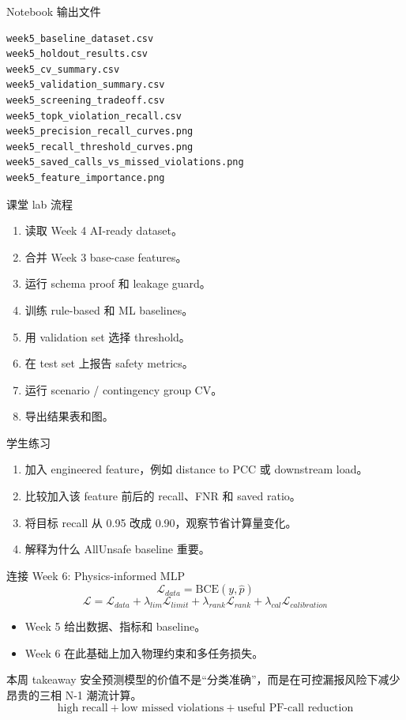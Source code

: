 \documentclass[aspectratio=169,11pt]{beamer}
\begin{document}
\begin{frame}[fragile]{Notebook 输出文件}
\begin{lstlisting}
week5_baseline_dataset.csv
week5_holdout_results.csv
week5_cv_summary.csv
week5_validation_summary.csv
week5_screening_tradeoff.csv
week5_topk_violation_recall.csv
week5_precision_recall_curves.png
week5_recall_threshold_curves.png
week5_saved_calls_vs_missed_violations.png
week5_feature_importance.png
\end{lstlisting}
\end{frame}

\begin{frame}{课堂 lab 流程}
\begin{enumerate}\item 读取 Week 4 AI-ready dataset。\item 合并 Week 3 base-case features。\item 运行 schema proof 和 leakage guard。\item 训练 rule-based 和 ML baselines。\item 用 validation set 选择 threshold。\item 在 test set 上报告 safety metrics。\item 运行 scenario / contingency group CV。\item 导出结果表和图。\end{enumerate}
\end{frame}

\begin{frame}{学生练习}
\begin{enumerate}\item 加入 engineered feature，例如 distance to PCC 或 downstream load。\item 比较加入该 feature 前后的 recall、FNR 和 saved ratio。\item 将目标 recall 从 0.95 改成 0.90，观察节省计算量变化。\item 解释为什么 AllUnsafe baseline 重要。\end{enumerate}
\end{frame}

\begin{frame}{连接 Week 6: Physics-informed MLP}
\[\mathcal{L}_{data}=\mathrm{BCE}(y,\hat p)\]
\[\mathcal{L}=\mathcal{L}_{data}+\lambda_{lim}\mathcal{L}_{limit}+\lambda_{rank}\mathcal{L}_{rank}+\lambda_{cal}\mathcal{L}_{calibration}\]
\begin{itemize}\item Week 5 给出数据、指标和 baseline。\item Week 6 在此基础上加入物理约束和多任务损失。\end{itemize}
\end{frame}

\begin{frame}{本周 takeaway}
\centering\Large 安全预测模型的价值不是“分类准确”，而是在可控漏报风险下减少昂贵的三相 N-1 潮流计算。
\vspace{0.4cm}\[\text{high recall} + \text{low missed violations} + \text{useful PF-call reduction}\]
\end{frame}
\end{document}
